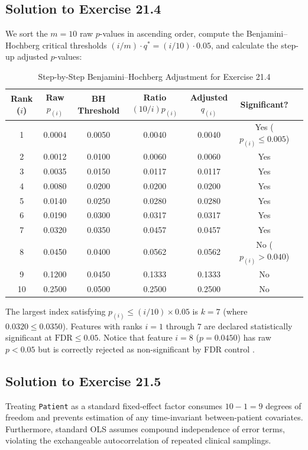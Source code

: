 \documentclass[11pt,twoside,openright]{book}
\begin{document}
\subsection*{Solution to Exercise 21.4}
We sort the $m = 10$ raw $p$-values in ascending order, compute the Benjamini--Hochberg critical thresholds $(i/m) \cdot q^* = (i/10) \cdot 0.05$, and calculate the step-up adjusted $p$-values:

\begin{table}[ht]
\centering
\caption{Step-by-Step Benjamini--Hochberg Adjustment for Exercise 21.4}
\small
\begin{tabularx}{\textwidth}{ccccccX}
\toprule
\textbf{Rank ($i$)} & \textbf{Raw $p_{(i)}$} & \textbf{BH Threshold} & \textbf{Ratio $(10/i) p_{(i)}$} & \textbf{Adjusted $q_{(i)}$} & \textbf{Significant?} \\
\midrule
1  & 0.0004 & 0.0050 & 0.0040 & 0.0040 & Yes ($p_{(i)} \le 0.005$) \\
2  & 0.0012 & 0.0100 & 0.0060 & 0.0060 & Yes \\
3  & 0.0035 & 0.0150 & 0.0117 & 0.0117 & Yes \\
4  & 0.0080 & 0.0200 & 0.0200 & 0.0200 & Yes \\
5  & 0.0140 & 0.0250 & 0.0280 & 0.0280 & Yes \\
6  & 0.0190 & 0.0300 & 0.0317 & 0.0317 & Yes \\
7  & 0.0320 & 0.0350 & 0.0457 & 0.0457 & Yes \\
8  & 0.0450 & 0.0400 & 0.0562 & 0.0562 & No ($p_{(i)} > 0.040$) \\
9  & 0.1200 & 0.0450 & 0.1333 & 0.1333 & No \\
10 & 0.2500 & 0.0500 & 0.2500 & 0.2500 & No \\
\bottomrule
\end{tabularx}
\end{table}

\noindent
The largest index satisfying $p_{(i)} \le (i/10) \times 0.05$ is $k = 7$ (where $0.0320 \le 0.0350$). Features with ranks $i = 1$ through $7$ are declared statistically significant at $\text{FDR} \le 0.05$. Notice that feature $i=8$ ($p = 0.0450$) has raw $p < 0.05$ but is correctly rejected as non-significant by FDR control \cite{benjamini1995controlling}.

\subsection*{Solution to Exercise 21.5}
Treating \texttt{Patient} as a standard fixed-effect factor consumes $10 - 1 = 9$ degrees of freedom and prevents estimation of any time-invariant between-patient covariates. Furthermore, standard OLS assumes compound independence of error terms, violating the exchangeable autocorrelation of repeated clinical samplings. 
\end{document}
